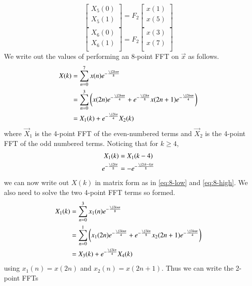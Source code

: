 \documentclass[journal,12pt,twocolumn]{IEEEtran}
\renewcommand\thesection{\arabic{section}}
\begin{document}
\begin{enumerate}[label=\thesection.\arabic*]
\begin{enumerate}[label=\arabic*.,ref=\thesection.\theenumi]
	\begin{equation}
		\begin{bmatrix}
			X_{5}(0) \\ 
			X_{5}(1)\\ 
		\end{bmatrix}
		= F_{2}
		\begin{bmatrix}
			x(1) \\ 
			x(5) \\ 
		\end{bmatrix}
	\end{equation}
	\begin{equation}
		\begin{bmatrix}
			X_{6}(0) \\ 
			X_{6}(1)\\ 
		\end{bmatrix}
		= F_{2}
		\begin{bmatrix}
			x(3) \\ 
			x(7) \\ 
		\end{bmatrix}
	\end{equation}
\solution We write out the values of performing an 8-point FFT on $\vec{x}$ as follows.
\begin{align}
	X(k) &= \sum_{n = 0}^{7}x(n)e^{-\frac{\j2kn\pi}{8}} \\
	&= \sum_{n = 0}^{3}\brak{x(2n)e^{-\frac{\j2kn\pi}{4}} + e^{-\frac{\j2k\pi}{8}}x(2n + 1)e^{-\frac{\j2kn\pi}{4}}} \\
	&= X_1(k) + e^{-\frac{\j2k\pi}{4}}X_2(k) 
\end{align}
where $\vec{X}_1$ is the 4-point FFT of the even-numbered terms and $\vec{X}_2$ is the 4-point FFT of the odd numbered terms. Noticing that for $k \geq 4$,
\begin{align}
	X_1(k) &= X_1(k - 4) \\
	e^{-\frac{\j2k\pi}{8}} &= -e^{-\frac{\j2(k - 4)\pi}{8}}
\end{align}
we can now write out $X(k)$ in matrix form as in \eqref{eq:8-low} and \eqref{eq:8-high}. We also need to solve the two 4-point FFT terms so formed.
\begin{align}
	X_1(k) &= \sum_{n = 0}^{3}x_1(n)e^{-\frac{\j2kn\pi}{8}} \\
	&= \sum_{n = 0}^{1}\brak{x_1(2n)e^{-\frac{\j2kn\pi}{4}} + e^{-\frac{\j2k\pi}{8}}x_2(2n + 1)e^{-\frac{\j2kn\pi}{4}}} \\
	&= X_3(k) + e^{-\frac{\j2k\pi}{4}}X_4(k) 
\end{align}
using $x_1(n) = x(2n)$ and $x_2(n) = x(2n + 1)$. Thus we can write the 2-point FFTs

\end{enumerate}
\end{enumerate}
\end{document}
